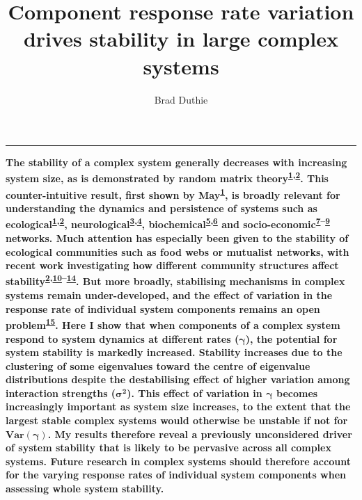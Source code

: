 \documentclass[]{article}
\title{Component response rate variation drives stability in large complex
systems}
\author{Brad Duthie}
\date{}
\begin{document}
\maketitle

\begin{center}\rule{0.5\linewidth}{\linethickness}\end{center}

\textbf{The stability of a complex system generally decreases with
increasing system size, as is demonstrated by random matrix
theory\textsuperscript{\protect\hyperlink{ref-May1972}{1},\protect\hyperlink{ref-Allesina2012}{2}}.
This counter-intuitive result, first shown by
May\textsuperscript{\protect\hyperlink{ref-May1972}{1}}, is broadly
relevant for understanding the dynamics and persistence of systems such
as
ecological\textsuperscript{\protect\hyperlink{ref-May1972}{1},\protect\hyperlink{ref-Allesina2012}{2}},
neurological\textsuperscript{\protect\hyperlink{ref-Gray2008}{3},\protect\hyperlink{ref-Gray2009}{4}},
biochemical\textsuperscript{\protect\hyperlink{ref-Rosenfeld2009}{5},\protect\hyperlink{ref-MacArthur2010}{6}}
and
socio-economic\textsuperscript{\protect\hyperlink{ref-Haldane2011}{7}--\protect\hyperlink{ref-Bardoscia2017}{9}}
networks. Much attention has especially been given to the stability of
ecological communities such as food webs or mutualist networks, with
recent work investigating how different community structures affect
stability\textsuperscript{\protect\hyperlink{ref-Allesina2012}{2},\protect\hyperlink{ref-Mougi2012}{10}--\protect\hyperlink{ref-Patel2018}{14}}.
But more broadly, stabilising mechanisms in complex systems remain
under-developed, and the effect of variation in the response rate of
individual system components remains an open
problem\textsuperscript{\protect\hyperlink{ref-Allesina2015}{15}}. Here
I show that when components of a complex system respond to system
dynamics at different rates (\(\boldsymbol{\gamma}\)), the potential for
system stability is markedly increased. Stability increases due to the
clustering of some eigenvalues toward the centre of eigenvalue
distributions despite the destabilising effect of higher variation among
interaction strengths (\(\boldsymbol{\sigma^{2}}\)). This effect of
variation in \(\boldsymbol{\gamma}\) becomes increasingly important as
system size increases, to the extent that the largest stable complex
systems would otherwise be unstable if not for
\(\boldsymbol{Var(\gamma)}\). My results therefore reveal a previously
unconsidered driver of system stability that is likely to be pervasive
across all complex systems. Future research in complex systems should
therefore account for the varying response rates of individual system
components when assessing whole system stability.}
\end{document}
